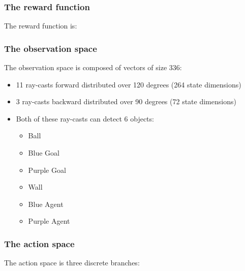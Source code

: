 \documentclass[11pt,a4paper]{article}
\begin{document}
\subsubsection{The reward function}\label{the-reward-function}

The reward function is:


\subsubsection{The observation space}\label{the-observation-space}

The observation space is composed of vectors of size 336:

\begin{itemize}
\tightlist
\item
  11 ray-casts forward distributed over 120 degrees (264 state dimensions)
\item
  3 ray-casts backward distributed over 90 degrees (72 state dimensions)
\item
  Both of these ray-casts can detect 6 objects:

  \begin{itemize}
  \tightlist
  \item
    Ball
  \item
    Blue Goal
  \item
    Purple Goal
  \item
    Wall
  \item
    Blue Agent
  \item
    Purple Agent
  \end{itemize}
\end{itemize}

\subsubsection{The action space}\label{the-action-space}

The action space is three discrete branches:

\end{document}
